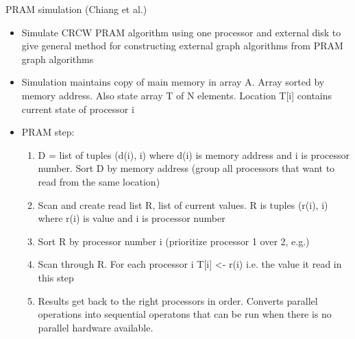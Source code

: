 PRAM simulation (Chiang et al.)
\begin{itemize}
    \item Simulate CRCW PRAM algorithm using one processor and external disk to give general method for constructing external graph algorithms from PRAM graph algorithms
    \item Simulation maintains copy of main memory in array A. Array sorted by memory address. Also state array T of N elements. Location T[i] contains current state of processor i
    \item PRAM step:
    \begin{enumerate}
        \item D = list of tuples (d(i), i) where d(i) is memory address and i is processor number. Sort D by memory address (group all processors that want to read from the same location)
        \item Scan and create read list R, list of current values. R is tuples (r(i), i) where r(i) is value and i is processor number
        \item Sort R by processor number i (prioritize processor 1 over 2, e.g.)
        \item Scan through R. For each processor i T[i] <- r(i) i.e. the value it read in this step
        \item Results get back to the right processors in order. Converts parallel operations into sequential operatons that can be run when there is no parallel hardware available. 
    \end{enumerate}
\end{itemize}

